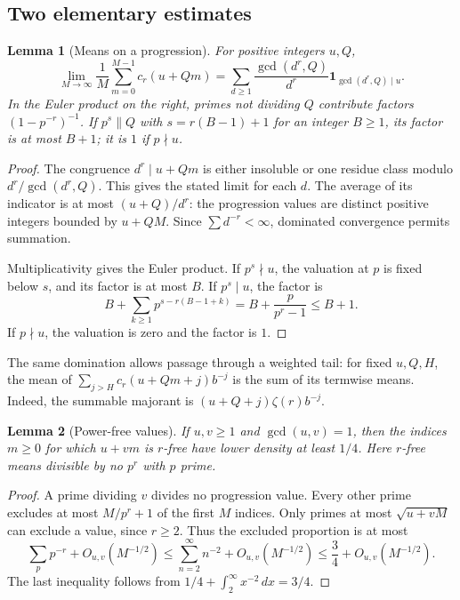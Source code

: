 \documentclass[11pt]{article}
\newcommand{\ind}{\mathbf 1}
\newcommand{\dd}{\,d}
\newtheorem{lemma}{Lemma}
\begin{document}
\subsection*{Two elementary estimates}

\begin{lemma}[Means on a progression]\label{lem:mean}
For positive integers $u,Q$,
\[
\lim_{M\to\infty}\frac1M\sum_{m=0}^{M-1}c_r(u+Qm)
=\sum_{d\ge1}\frac{\gcd(d^r,Q)}{d^r}
  \ind_{\gcd(d^r,Q)\mid u}.
\]
In the Euler product on the right, primes not dividing $Q$ contribute
factors $(1-p^{-r})^{-1}$. If $p^s\parallel Q$ with
$s=r(B-1)+1$ for an integer $B\ge1$, its factor is at most $B+1$;
it is $1$ if $p\nmid u$.
\end{lemma}

\begin{proof}
The congruence $d^r\mid u+Qm$ is either insoluble or one residue class
modulo $d^r/\gcd(d^r,Q)$. This gives the stated limit for each $d$.
The average of its indicator is at most $(u+Q)/d^r$: the progression
values are distinct positive integers bounded by $u+QM$.
Since $\sum d^{-r}<\infty$, dominated convergence permits summation.

Multiplicativity gives the Euler product. If $p^s\nmid u$, the valuation
at $p$ is fixed below $s$, and its factor is at most $B$.
If $p^s\mid u$, the factor is
\[
B+\sum_{k\ge1}p^{s-r(B-1+k)}
 =B+\frac{p}{p^r-1}\le B+1.
\]
If $p\nmid u$, the valuation is zero and the factor is $1$.
\end{proof}

The same domination allows passage through a weighted tail: for fixed
$u,Q,H$, the mean of $\sum_{j>H}c_r(u+Qm+j)b^{-j}$ is the sum of its
termwise means. Indeed, the summable majorant is
$(u+Q+j)\zeta(r)b^{-j}$.

\begin{lemma}[Power-free values]\label{lem:sieve}
If $u,v\ge1$ and $\gcd(u,v)=1$, then the indices $m\ge0$ for which
$u+vm$ is $r$-free have lower density at least $1/4$.
Here $r$-free means divisible by no $p^r$ with $p$ prime.
\end{lemma}

\begin{proof}
A prime dividing $v$ divides no progression value. Every other prime
excludes at most $M/p^r+1$ of the first $M$ indices. Only primes at most
$\sqrt{u+vM}$ can exclude a value, since $r\ge2$. Thus the excluded
proportion is at most
\[
\sum_p p^{-r}+O_{u,v}(M^{-1/2})
\le\sum_{n=2}^{\infty}n^{-2}+O_{u,v}(M^{-1/2})
\le\frac34+O_{u,v}(M^{-1/2}).
\]
The last inequality follows from $1/4+\int_2^\infty x^{-2}\dd x=3/4$.
\end{proof}
\end{document}
